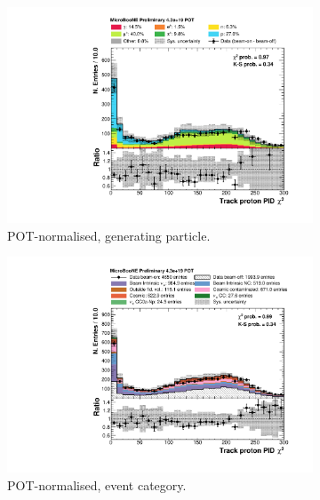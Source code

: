 \begin{figure}[htbp]
\centering
  \begin{subfigure}{0.49\textwidth}
    \includegraphics[width=\linewidth]{figures/h_track_pidchipr_pdg.pdf}
    \caption{POT-normalised, generating particle.} \label{fig:proton_pdg}
  \end{subfigure}
  \begin{subfigure}{0.49\textwidth}
    \includegraphics[width=\linewidth]{figures/h_track_pidchipr.pdf}
    \caption{POT-normalised, event category.} \label{fig:proton_pot}
  \end{subfigure}
  \begin{subfigure}{0.49\textwidth}

\end{subfigure}
\end{figure}
